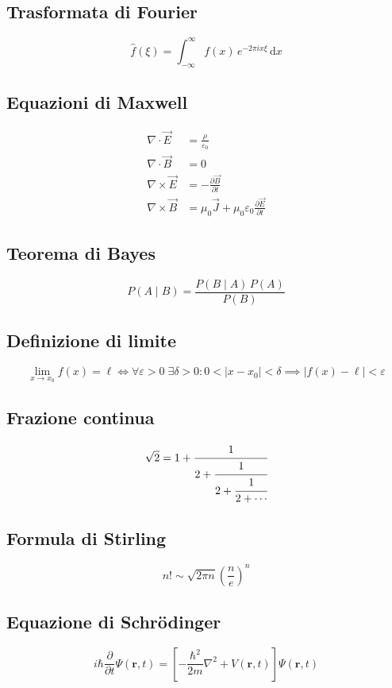 \documentclass[a4paper,11pt]{article}
\begin{document}
\subsection*{Trasformata di Fourier}
\[
\hat{f}(\xi) = \int_{-\infty}^{\infty} f(x)\, e^{-2\pi i x \xi}\,\mathrm{d}x
\]

\subsection*{Equazioni di Maxwell}
\begin{align*}
  \nabla \cdot \vec{E} &= \frac{\rho}{\varepsilon_0} %
  \\
  \nabla \cdot \vec{B} &= 0 \\
  \nabla \times \vec{E} &= -\frac{\partial \vec{B}}{\partial t} %
  \\
  \nabla \times \vec{B} &= \mu_0 \vec{J} + \mu_0 \varepsilon_0 \frac{\partial \vec{E}}{\partial t}
\end{align*}

\subsection*{Teorema di Bayes}
\[
P(A \mid B) = \frac{P(B \mid A)\, P(A)}{P(B)}
\]

\subsection*{Definizione di limite}
\[
\lim_{x \to x_0} f(x) = \ell \iff \forall \varepsilon > 0\; \exists \delta > 0 : 0 < |x - x_0| < \delta \implies |f(x) - \ell| < \varepsilon
\]

\subsection*{Frazione continua}
\[
\sqrt{2} = 1 + \cfrac{1}{2 + \cfrac{1}{2 + \cfrac{1}{2 + \cdots}}}
\]

\subsection*{Formula di Stirling}
\[
n! \sim \sqrt{2\pi n}\left(\frac{n}{e}\right)^{n}
\]

\subsection*{Equazione di Schrödinger}
\begin{equation}
  i\hbar \frac{\partial}{\partial t} \Psi(\mathbf{r},t) = \left[ -\frac{\hbar^2}{2m}\nabla^2 + V(\mathbf{r},t) \right] \Psi(\mathbf{r},t)
\end{equation}
\end{document}
